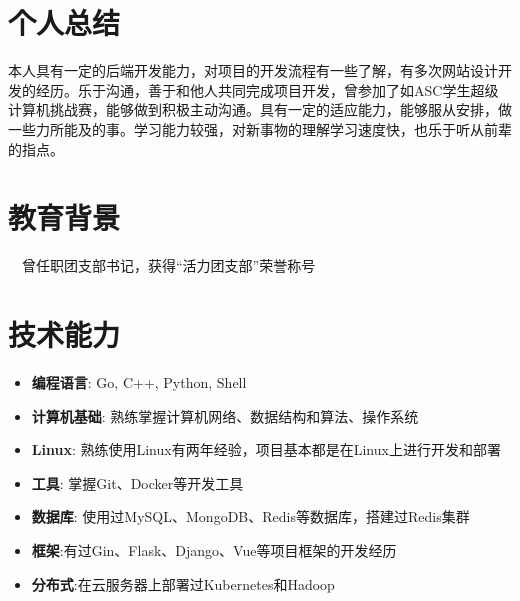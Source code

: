 \documentclass{resume}
\begin{document}


 
\section{个人总结}
本人具有一定的后端开发能力，对项目的开发流程有一些了解，有多次网站设计开发的经历。乐于沟通，善于和他人共同完成项目开发，曾参加了如ASC学生超级计算机挑战赛，能够做到积极主动沟通。具有一定的适应能力，能够服从安排，做一些力所能及的事。学习能力较强，对新事物的理解学习速度快，也乐于听从前辈的指点。

\section{教育背景}
\ \ 曾任职团支部书记，获得“活力团支部”荣誉称号

\section{技术能力}
\begin{itemize}[parsep=0.5ex]
  \item \textbf{编程语言}: Go, C++, Python, Shell
  \item \textbf{计算机基础}: 熟练掌握计算机网络、数据结构和算法、操作系统
  \item \textbf{Linux}: 熟练使用Linux有两年经验，项目基本都是在Linux上进行开发和部署
  \item \textbf{工具}: 掌握Git、Docker等开发工具
  \item \textbf{数据库}: 使用过MySQL、MongoDB、Redis等数据库，搭建过Redis集群
  \item \textbf{框架}:有过Gin、Flask、Django、Vue等项目框架的开发经历
  \item \textbf{分布式}:在云服务器上部署过Kubernetes和Hadoop
\end{itemize}
\end{document}
